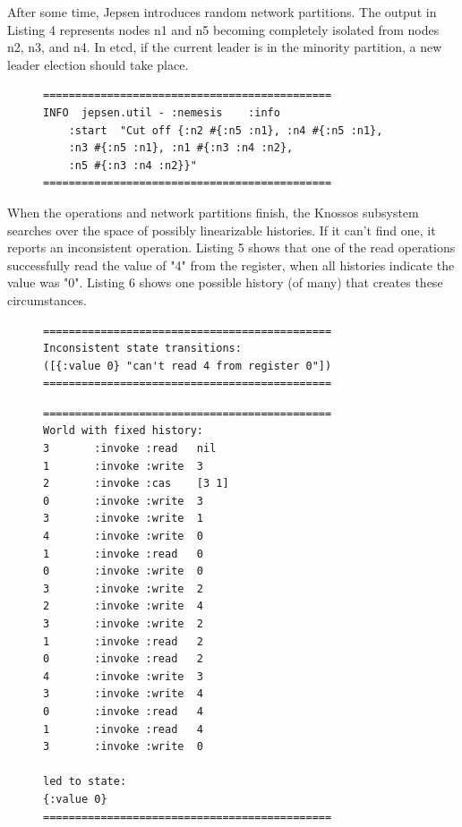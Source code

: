 \documentclass[12pt,conference]{IEEEtran}
\begin{document}
After some time, Jepsen introduces random network partitions. The output in Listing 4 represents nodes n1 and n5 becoming completely isolated from nodes n2, n3, and n4. In etcd, if the current leader is in the minority partition, a new leader election should take place.

\begin{figure}[!t]
    \scriptsize
\begin{lstlisting}[caption={Network Partition},label={networkPartition}]
=============================================
INFO  jepsen.util - :nemesis    :info   
	:start  "Cut off {:n2 #{:n5 :n1}, :n4 #{:n5 :n1}, 
	:n3 #{:n5 :n1}, :n1 #{:n3 :n4 :n2}, 
	:n5 #{:n3 :n4 :n2}}"
=============================================
\end{lstlisting}
\end{figure}

When the operations and network partitions finish, the Knossos subsystem searches over the space of possibly linearizable histories. If it can't find one, it reports an inconsistent operation. Listing 5 shows that one of the read operations successfully read the value of "4" from the register, when all histories indicate the value was "0". Listing 6 shows one possible history (of many) that creates these circumstances.

\begin{figure}[!t]
    \scriptsize
\begin{lstlisting}[caption={Failure Result},label={failureResult}]
=============================================
Inconsistent state transitions:
([{:value 0} "can't read 4 from register 0"])
=============================================
\end{lstlisting}
\end{figure}

\begin{figure}[!t]
    \scriptsize
\begin{lstlisting}[caption={Non-linearizable History},label={nlHistory}]
=============================================
World with fixed history:
3       :invoke :read   nil
1       :invoke :write  3
2       :invoke :cas    [3 1]
0       :invoke :write  3
3       :invoke :write  1
4       :invoke :write  0
1       :invoke :read   0
0       :invoke :write  0
3       :invoke :write  2
2       :invoke :write  4
3       :invoke :write  2
1       :invoke :read   2
0       :invoke :read   2
4       :invoke :write  3
3       :invoke :write  4
0       :invoke :read   4
1       :invoke :read   4
3       :invoke :write  0

led to state:
{:value 0}
=============================================
\end{lstlisting}
\end{figure}
\end{document}
